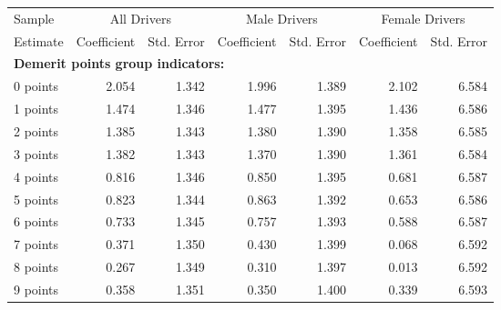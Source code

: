 
\begin{table}%
\centering 
\begin{tabular}{l r r r r r r} 

\hline 
 

Sample 
 & \multicolumn{2}{c}{All  Drivers}  & \multicolumn{2}{c}{Male  Drivers}  & \multicolumn{2}{c}{Female  Drivers}   \\ 
 

 \cmidrule(lr){1-1}\cmidrule(lr){2-3}\cmidrule(lr){4-5}\cmidrule(lr){6-7} 

Estimate  & Coefficient & Std. Error  & Coefficient & Std. Error  & Coefficient & Std. Error   \\ 
 

\hline 
 
\multicolumn{4}{l}{\textbf{Demerit points group indicators:}}  \\ 
 
0 points  &  2.054  &  1.342  &  1.996  &  1.389  &  2.102  &  6.584   \\ 
 
1 points  &  1.474  &  1.346  &  1.477  &  1.395  &  1.436  &  6.586   \\ 
 
2 points  &  1.385  &  1.343  &  1.380  &  1.390  &  1.358  &  6.585   \\ 
 
3 points  &  1.382  &  1.343  &  1.370  &  1.390  &  1.361  &  6.584   \\ 
 
4 points  &  0.816  &  1.346  &  0.850  &  1.395  &  0.681  &  6.587   \\ 
 
5 points  &  0.823  &  1.344  &  0.863  &  1.392  &  0.653  &  6.586   \\ 
 
6 points  &  0.733  &  1.345  &  0.757  &  1.393  &  0.588  &  6.587   \\ 
 
7 points  &  0.371  &  1.350  &  0.430  &  1.399  &  0.068  &  6.592   \\ 
 
8 points  &  0.267  &  1.349  &  0.310  &  1.397  &  0.013  &  6.592   \\ 
 
9 points  &  0.358  &  1.351  &  0.350  &  1.400  &  0.339  &  6.593   \\ 
 

\end{tabular}
\end{table}
